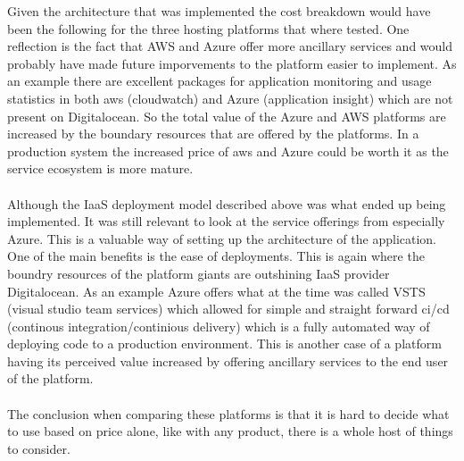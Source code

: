 \documentclass[]{uiophd}
\begin{document}
Given the architecture that was implemented the cost breakdown would have been the following for the three hosting platforms that where tested. One reflection is the fact that AWS and Azure offer more ancillary services and would probably have made future imporvements to the platform easier to implement. As an example there are excellent packages for application monitoring and usage statistics in both aws (cloudwatch) and Azure (application insight) which are not present on Digitalocean. So the total value of the Azure and AWS platforms are increased by the boundary resources that are offered by the platforms. In a production system the increased price of aws and Azure could be worth it as the service ecosystem is more mature. 
\\\\
Although the IaaS deployment model described above was what ended up being implemented. It was still relevant to look at the service offerings from especially Azure. This is a valuable way of setting up the architecture of the application. One of the main benefits is the ease of deployments. This is again where the boundry resources of the platform giants are outshining IaaS provider Digitalocean. As an example Azure offers what at the time was called VSTS (visual studio team services) which allowed for simple and straight forward ci/cd (continous integration/continious delivery) which is a fully automated way of deploying code to a production environment. This is another case of a platform having its perceived value increased by offering ancillary services to the end user of the platform. 
\\\\
The conclusion when comparing these platforms is that it is hard to decide what to use based on price alone, like with any product, there is a whole host of things to consider.
\end{document}
